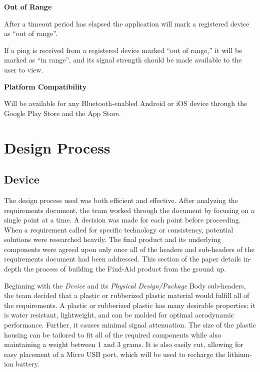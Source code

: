 \documentclass[12pt]{article}
\begin{document}
\begin{packed_enum}
\begin{packed_enum}
\begin{packed_enum}
		  			\item \textbf{Out of Range}
		  			\begin{packed_enum}
		  				\item After a timeout period has elapsed the application will mark a registered device as ``out of range''.
		  				\item If a ping is received from a registered device marked ``out of range,'' it will be marked as ``in range'', and its signal strength should be made available to the user to view.
		  				\end{packed_enum}
		  		\end{packed_enum}
		  		\item \textbf{Platform Compatibility}
		  		\begin{packed_enum}
		  			\item Will be available for any Bluetooth-enabled Android or iOS device through the Google Play Store and the App Store.
		  			\end{packed_enum}
		  		
		  	\end{packed_enum}
		  \end{packed_enum}
	
	\section{Design Process}
	\subsection{Device}
	The design process used was both efficient and effective. After analyzing the requirements document, the team worked through the document by focusing on a single point at a time. A decision was made for each point before proceeding. When a requirement called for specific technology or consistency, potential solutions were researched heavily. The final product and its underlying components were agreed upon only once all of the headers and sub-headers of the requirements document had been addressed. This section of the paper details in-depth the process of building the Find-Aid product from the ground up.

Beginning with the \emph{Device} and its \emph{Physical Design/Package} Body sub-headers, the team decided that a plastic or rubberized plastic material would fulfill all of the requirements. A plastic or rubberized plastic has many desirable properties: it is water resistant, lightweight, and can be molded for optimal aerodynamic performance. Further, it causes minimal signal attenuation. The size of the plastic housing can be tailored to fit all of the required components while also maintaining a weight between 1 and 3 grams. It is also easily cut, allowing for easy placement of a Micro USB port, which will be used to recharge the lithium-ion battery. 
\end{document}
